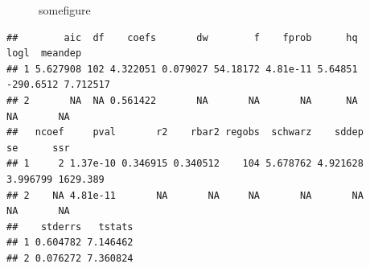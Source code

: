 \documentclass[
]{article}
\begin{document}
\begin{figure}[h]

{\centering {}\newline{}

}

\caption{somefigure}\label{fig:mychunk}
\end{figure}

\begin{verbatim}
##        aic  df    coefs       dw        f    fprob      hq      logl  meandep
## 1 5.627908 102 4.322051 0.079027 54.18172 4.81e-11 5.64851 -290.6512 7.712517
## 2       NA  NA 0.561422       NA       NA       NA      NA        NA       NA
##   ncoef     pval       r2    rbar2 regobs  schwarz    sddep       se      ssr
## 1     2 1.37e-10 0.346915 0.340512    104 5.678762 4.921628 3.996799 1629.389
## 2    NA 4.81e-11       NA       NA     NA       NA       NA       NA       NA
##    stderrs   tstats
## 1 0.604782 7.146462
## 2 0.076272 7.360824
\end{verbatim}
\end{document}
